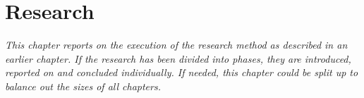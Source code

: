 \chapter{Research}
\emph{This chapter reports on the execution of the research method as described in an earlier
chapter. If the research has been divided into phases, they are introduced, reported on and
concluded individually. If needed, this chapter could be split up to balance out the sizes of all
chapters.}

